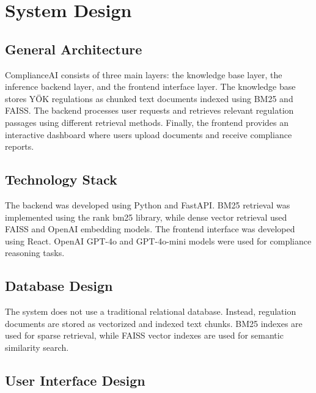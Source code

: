 \documentclass[a4paper,12pt]{article}
\begin{document}

\section{System Design}

\subsection{General Architecture}

\hspace{0.5cm} ComplianceAI consists of three main layers: the knowledge base layer, the inference backend layer, and the frontend interface layer. The knowledge base stores YÖK regulations as chunked text documents indexed using BM25 and FAISS. The backend processes user requests and retrieves relevant regulation passages using different retrieval methods. Finally, the frontend provides an interactive dashboard where users upload documents and receive compliance reports.

\subsection{Technology Stack}

\hspace{0.5cm} The backend was developed using Python and FastAPI. BM25 retrieval was implemented using the rank bm25 library, while dense vector retrieval used FAISS and OpenAI embedding models. The frontend interface was developed using React. OpenAI GPT-4o and GPT-4o-mini models were used for compliance reasoning tasks.

\subsection{Database Design}

\hspace{0.5cm} The system does not use a traditional relational database. Instead, regulation documents are stored as vectorized and indexed text chunks. BM25 indexes are used for sparse retrieval, while FAISS vector indexes are used for semantic similarity search.

\subsection{User Interface Design}
\end{document}
